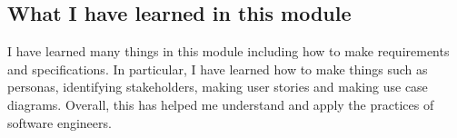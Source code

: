 

\subsection{What I have learned in this module}
I have learned many things in this module including how to make requirements and specifications. In particular, I have learned how to make things such as personas, identifying stakeholders, making user stories and making use case diagrams. Overall, this has helped me understand and apply the practices of software engineers.

